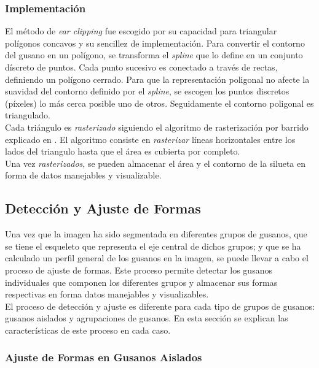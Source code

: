 \subsubsection{Implementaci\'on}

El m\'etodo de \emph{ear clipping} fue escogido por su capacidad para triangular pol\'igonos
concavos y su sencillez de implementaci\'on. Para convertir el contorno del gusano en un 
pol\'igono, se transforma el \emph{spline} que lo define en un conjunto d\'iscreto de puntos.
Cada punto sucesivo es conectado a trav\'es de rectas, definiendo un pol\'igono cerrado. 
Para que la representaci\'on poligonal no afecte la suavidad del contorno definido por el
\emph{spline}, se escogen los puntos discretos (p\'ixeles) lo m\'as cerca posible uno de otros.
Seguidamente el contorno poligonal es triangulado.\\

Cada tri\'angulo es \emph{rasterizado} siguiendo el algoritmo de rasterizaci\'on por barrido
explicado en \cite{scanconversion}. El algoritmo consiste en \emph{rasterizar} 
l\'ineas horizontales entre los lados del triangulo hasta que el \'area es cubierta por completo.\\

Una vez \emph{rasterizados}, se pueden almacenar el \'area y el contorno de la silueta en
forma de datos manejables y visualizable. 

\subsection{Detecci\'on y Ajuste de Formas}
\label{sec:metfit}

Una vez que la imagen ha sido segmentada en diferentes grupos de gusanos, que se tiene
el esqueleto que representa el eje central de dichos grupos; y que se ha calculado un
perfil general de los gusanos en la imagen, se puede llevar a cabo el proceso de ajuste
de formas. Este proceso permite detectar los gusanos individuales que componen los 
diferentes grupos y almacenar sus formas respectivas en forma datos manejables y visualizables.\\

El proceso de detecci\'on y ajuste es diferente para cada tipo de grupos de gusanos: 
gusanos aislados y agrupaciones de gusanos. En esta secci\'on se explican las 
caracter\'isticas de este proceso en cada caso.

\subsubsection{Ajuste de Formas en Gusanos Aislados}
\label{sec:metiso}

